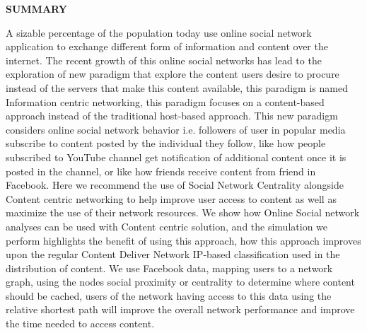 \clearpage
\begin{centering}
\textbf{SUMMARY}\\
\vspace{\baselineskip}
\end{centering}

A sizable percentage of the population today use online social network application to exchange different form of information and content over the internet. The recent growth of this online social networks has lead to the exploration of new paradigm that explore the content users desire to procure instead of the servers that make this content available, this paradigm is named Information centric networking, this paradigm focuses on a content-based approach instead of the traditional host-based approach. This new paradigm considers online social network behavior i.e. followers of user in popular media subscribe to content posted by the individual they follow, like how people subscribed to YouTube channel get notification of additional content once it is posted in the channel, or like how friends receive content from friend in Facebook. 
Here we recommend the use of Social Network Centrality alongside Content centric networking to help improve user access to content as well as maximize the use of their network resources. We show how Online Social network analyses can be used with Content centric solution, and the simulation we perform highlights the benefit of using this approach, how this approach improves upon the regular Content Deliver Network IP-based classification used in the distribution of content. We use Facebook data, mapping users to a network graph, using the nodes social proximity or centrality to determine where content should be cached, users of the network having access to this data using the relative shortest path will improve the overall network performance and improve the time needed to access content. 


